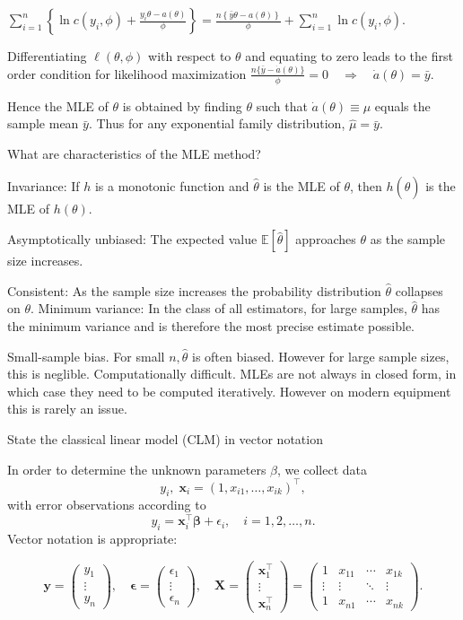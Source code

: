 \documentclass[11pt,a4paper,twoside]{article}
\begin{document}
\(
\sum_{i=1}^{n} \left\{ \ln c(y_i, \phi) + \frac{y_i \theta - a(\theta)}{\phi} \right\} = \frac{n \left\{ \bar{y} \theta - a(\theta) \right\}}{\phi} + \sum_{i=1}^{n} \ln c(y_i, \phi).
\)

Differentiating \(\ell(\theta, \phi)\) with respect to \(\theta\) and equating to zero leads to the first order condition for 
likelihood maximization
\(
\frac{n \{\bar{y} - \dot{a}(\theta)\}}{\phi} = 0 \quad \Rightarrow \quad \dot{a}(\theta) = \bar{y}.
\)

Hence the MLE of \(\theta\) is obtained by finding \(\theta\) such that \(\dot{a}(\theta) \equiv \mu\) equals the sample mean \(\bar{y}\). 
Thus for any exponential family distribution, \(\hat{\mu} = \bar{y}\).


What are characteristics of the MLE method?

Invariance: If \( h \) is a monotonic function and \( \hat{\theta} \) is the MLE of \( \theta \), then \( h(\hat{\theta}) \)
is the MLE of \( h(\theta) \).

Asymptotically unbiased: The expected value \( \mathbb{E}[\hat{\theta}] \) approaches \( \theta \) as the
sample size increases.

Consistent: As the sample size increases the probability distribution \( \hat{\theta} \) collapses on \( \theta \).
Minimum variance: In the class of all estimators, for large samples, \( \hat{\theta} \) has the minimum variance and 
is therefore the most precise estimate possible.

Small-sample bias. For small \( n, \hat{\theta} \) is often biased. However for large sample sizes, this is neglible.
Computationally difficult. MLEs are not always in closed form, in which case they need to be computed iteratively.
However on modern equipment this is rarely an issue.


State the classical linear model (CLM) in vector notation

In order to determine the unknown parameters \(\beta\), we collect data
\[ y_i, \; \mathbf{x}_i = (1, x_{i1}, \ldots, x_{ik})^\top, \]
with error observations according to
\[ y_i = \mathbf{x}_i^\top \boldsymbol{\beta} + \epsilon_i, \quad i = 1, 2, \ldots, n. \]
Vector notation is appropriate:

\[ 
\mathbf{y} = \begin{pmatrix}
y_1 \\
\vdots \\
y_n
\end{pmatrix}, \quad \boldsymbol{\epsilon} = \begin{pmatrix}
\epsilon_1 \\
\vdots \\
\epsilon_n
\end{pmatrix}, \quad \mathbf{X} = \begin{pmatrix}
\mathbf{x}_1^\top \\
\vdots \\
\mathbf{x}_n^\top
\end{pmatrix} = \begin{pmatrix}
1 & x_{11} & \cdots & x_{1k} \\
\vdots & \vdots & \ddots & \vdots \\
1 & x_{n1} & \cdots & x_{nk}
\end{pmatrix}.
\]
\end{document}
